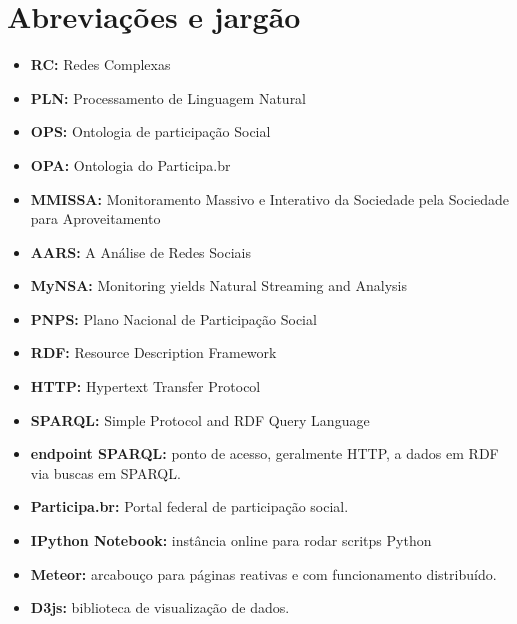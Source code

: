 \section*{Abreviações e jargão}
\begin{itemize}[label={}]
    \item {\bf RC:              } Redes Complexas
    \item {\bf PLN:             } Processamento de Linguagem Natural
    \item {\bf OPS:             } Ontologia de participação Social
    \item {\bf OPA:             } Ontologia do Participa.br
    \item {\bf MMISSA:          } Monitoramento Massivo e Interativo da Sociedade pela Sociedade para Aproveitamento
    \item {\bf AARS:            } A Análise de Redes Sociais
    \item {\bf MyNSA:           } Monitoring yields Natural Streaming and Analysis
    \item {\bf PNPS:            } Plano Nacional de Participação Social
    \item {\bf RDF:             } Resource Description Framework
    \item {\bf HTTP:            } Hypertext Transfer Protocol
    \item {\bf SPARQL:          } Simple Protocol and RDF Query Language
    \item {\bf endpoint SPARQL: } ponto de acesso, geralmente HTTP, a dados em RDF via buscas em SPARQL.
    \item {\bf Participa.br:    } Portal federal de participação social.
    \item {\bf IPython Notebook:} instância online para rodar scritps Python
    \item {\bf Meteor:          } arcabouço para páginas reativas e com funcionamento distribuído.
    \item {\bf D3js:            } biblioteca de visualização de dados.
\end{itemize}

